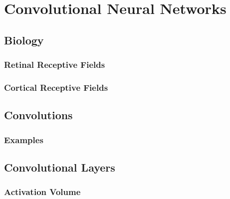 \chapter{Convolutional Neural Networks} %

	\section{Biology} %

		\subsection{Retinal Receptive Fields} %

		\subsection{Cortical Receptive Fields} %

	\section{Convolutions} %

		\subsection{Examples} %

	\section{Convolutional Layers} %

		\subsection{Activation Volume} %

